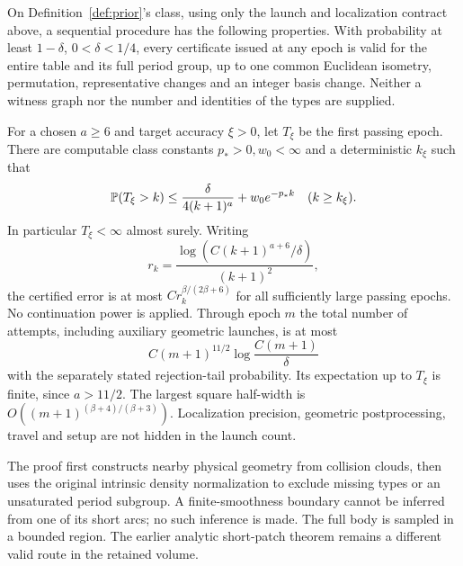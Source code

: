 \begin{theorem}\label{thm:main}
On Definition~\ref{def:prior}'s class, using only the launch and localization
contract above, a sequential procedure has the following properties.
With probability at least $1-\delta$, $0<\delta<1/4$, every certificate
issued at any epoch is valid for the entire table and its full period
group, up to one common Euclidean isometry, permutation, representative
changes and an integer basis change. Neither a witness graph nor the
number and identities of the types are supplied.

For a chosen $a\ge6$ and target accuracy $\xi>0$, let $T_\xi$ be the
first passing epoch. There are computable class constants $p_*>0,w_0<\infty$
and a deterministic $k_\xi$ such that
\begin{equation}\label{eq:tail-main}
 \mathbb P(T_\xi>k)\le \frac{\delta}{4(k+1)^a}+w_0e^{-p_*k}
 \quad(k\ge k_\xi).
\end{equation}
In particular $T_\xi<\infty$ almost surely. Writing
\[
 r_k=\frac{\log(C(k+1)^{a+6}/\delta)}{(k+1)^2},
\]
the certified error is at most $C r_k^{\beta/(2\beta+6)}$ for all
sufficiently large passing epochs. No continuation power is applied.
Through epoch $m$ the total number of attempts, including auxiliary
geometric launches, is at most
\begin{equation}\label{eq:cost-main}
 C(m+1)^{11/2}\log\frac{C(m+1)}{\delta}
\end{equation}
with the separately stated rejection-tail probability. Its expectation
up to $T_\xi$ is finite, since $a>11/2$. The largest square half-width is
$O((m+1)^{(\beta+4)/(\beta+3)})$. Localization precision, geometric
postprocessing, travel and setup are not hidden in the launch count.
\end{theorem}

The proof first constructs nearby physical geometry from collision clouds,
then uses the original intrinsic density normalization to exclude missing
types or an unsaturated period subgroup. A finite-smoothness boundary
cannot be inferred from one of its short arcs; no such inference is made.
The full body is sampled in a bounded region. The earlier analytic
short-patch theorem remains a different valid route in the retained volume.
